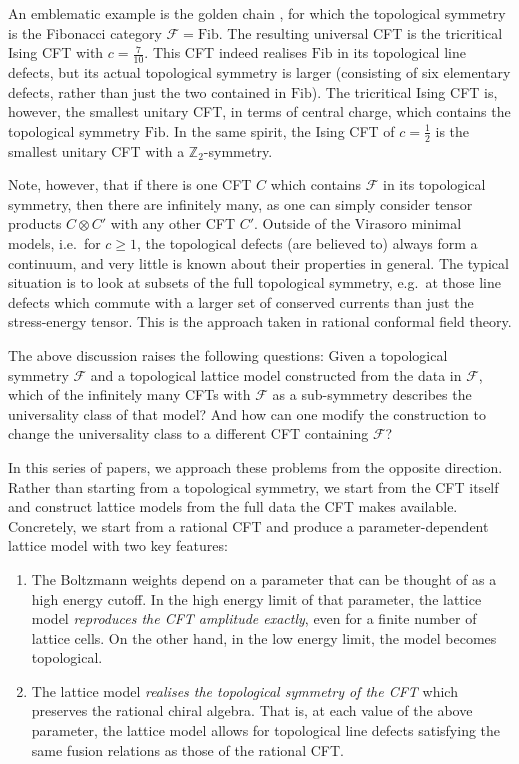 \documentclass[11pt,a4paper]{article}
\numberwithin{equation}{section}
\begin{document}
An emblematic example is the golden chain \cite{PhysRevLett.98.160409}, for which the topological symmetry is the Fibonacci category $\mathcal{F} = \mathrm{Fib}$. The resulting universal CFT is the tricritical Ising CFT with $c=\frac{7}{10}$. This CFT indeed realises $\mathrm{Fib}$ in its topological line defects, but its actual topological symmetry is larger (consisting of six elementary defects, rather than just the two contained in $\mathrm{Fib}$). The tricritical Ising CFT is, however, the smallest unitary CFT, in terms of central charge, which contains the topological symmetry $\mathrm{Fib}$. In the same spirit, the Ising CFT of $c = \frac12$ is the smallest unitary CFT with a $\mathbb{Z}_2$-symmetry.

Note, however, that if there is one CFT $C$ which contains $\mathcal{F}$ in its topological symmetry, then there are infinitely many, as one can simply consider tensor products $C \otimes C'$ with any other CFT $C'$. Outside of the Virasoro minimal models, i.e.\ for $c \ge 1$, the topological defects (are believed to) always form a continuum, and very little is known about their properties in general. The typical situation is to look at subsets of the full topological symmetry, e.g.\ at those line defects which commute with a larger set of conserved currents than just the stress-energy tensor. This is the approach taken in rational conformal field theory. 

\medskip

The above discussion raises the following questions: Given a topological symmetry $\mathcal{F}$ and a topological lattice model constructed from the data in $\mathcal{F}$, which of the infinitely many CFTs with $\mathcal{F}$ as a sub-symmetry describes the universality class of that model? And how can one modify the construction to change the universality class to a different CFT containing $\mathcal{F}$?

In this series of papers, we approach these problems from the opposite direction. Rather than starting from a topological symmetry, we start from the CFT itself and construct lattice models from the full data the CFT makes available. Concretely, we start from a rational CFT and produce a parameter-dependent lattice model with two key features:
%
\begin{enumerate}
\item The Boltzmann weights depend on a parameter that can be thought of as a high energy cutoff. In the high energy limit of that parameter, the lattice model \textit{reproduces the CFT amplitude exactly}, even for a finite number of lattice cells. On the other hand, in the low energy limit, the model becomes topological.

\item The lattice model \textit{realises the topological symmetry of the CFT} which preserves the rational chiral algebra. That is, at each value of the above parameter, the lattice model allows for topological line defects satisfying the same fusion relations as those of the rational CFT.
\end{enumerate}
\end{document}
